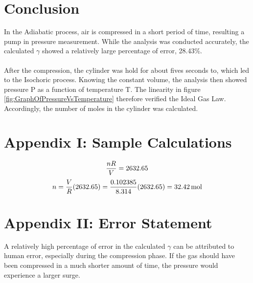 \documentclass[12pt]{article}
\begin{document}
\section{Conclusion}
In the Adiabatic process, air is compressed in a short period of time, resulting a pump in pressure measurement. While the analysis was conducted accurately, the calculated $\gamma$ showed a relatively large percentage of error, 28.43\%. 
\\
\\
\noindent After the compression, the cylinder was hold for about fives seconds to, which led to the Isochoric process. Knowing the constant volume, the analysis then showed pressure P as a function of temperature T. The linearity in figure \ref{fig:GraphOfPressureVsTemperature} therefore verified the Ideal Gas Law. Accordingly, the number of moles in the cylinder was calculated. 

\section{Appendix I: Sample Calculations}
\begin{equation}
    \frac{nR}{V} = 2632.65 
    \notag
\end{equation}
\begin{equation}
    n =\frac{V}{R}(2632.65) = \frac{0.102385}{8.314}(2632.65) = \SI{32.42}{mol}
    \notag
\end{equation}

\section{Appendix II: Error Statement}

A relatively high percentage of error in the calculated $\gamma$ can be attributed to human error, especially during the compression phase. If the gas should have been compressed in a much shorter amount of time, the pressure would experience a larger surge. 
\end{document}
